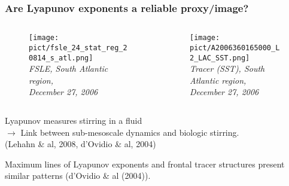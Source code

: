 \documentclass[compress,slidescentered,notes=hide]{beamer}
\newcommand{\legende}[1]{\textit{\footnotesize #1}}
\begin{document}
\begin{frame}
  \frametitle{Are Lyapunov exponents a reliable proxy/image?}
  \begin{columns}
    \begin{column}{0.5\textwidth}
      \begin{figure}%
        \texttt{[image: pict/fsle\_24\_stat\_reg\_20814\_s\_atl.png]}\\
        \legende{FSLE, South Atlantic region, \\December 27, 2006}
      \end{figure}
    \end{column}
    \begin{column}{0.5\textwidth}
      \begin{figure}
        \texttt{[image: pict/A2006360165000\_L2\_LAC\_SST.png]}\\
        \legende{Tracer (SST), South Atlantic region, \\December 27, 2006}
      \end{figure}
    \end{column}
  \end{columns}
  \vspace{0.5cm}
  \begin{block}{}
  Lyapunov measures stirring in a fluid \\
  $\rightarrow$ Link between sub-mesoscale dynamics and biologic stirring. \\
  (Lehahn \& al, 2008, d'Ovidio \& al, 2004)
  \end{block}
  Maximum lines of Lyapunov exponents and frontal tracer structures present similar patterns (d'Ovidio \& al (2004)).
\end{frame}
\end{document}
